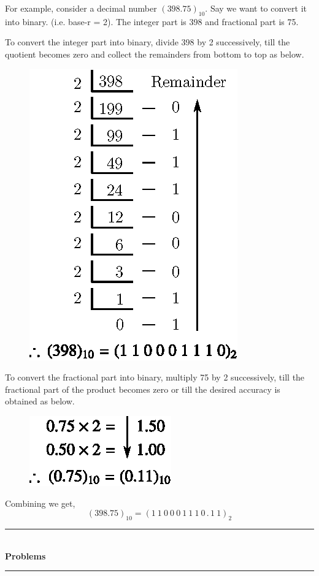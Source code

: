 For example, consider a decimal number $(398.75)_{10}$. Say we want to convert it into binary. (i.e. base-r = 2). The integer part is 398 and fractional part is 75.

To convert the integer part into binary, divide 398 by 2 successively, till the quotient becomes zero and collect the remainders from bottom to top as below.
\begin{figure}[H]
\centering
\includegraphics[scale=.9]{chap5/div1.eps}
\end{figure}


To convert the fractional part into binary, multiply 75 by 2 successively, till the fractional part of the product becomes zero or till the desired accuracy is obtained as below.
\begin{figure}[H]
\centering
\includegraphics{chap5/div2.eps}
\end{figure}

Combining we get,
$$
(398.75)_{10}=(1~1~0~0~0~1~1~1~0\,.\,1~1)_{2}
$$

\begin{center}
\rule{4cm}{1pt}\\
{\bf\Large Problems}\\[-3pt]
\rule{4cm}{1pt}
\end{center}

